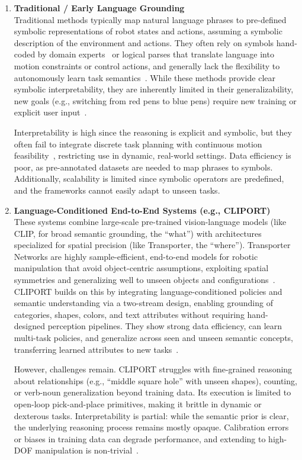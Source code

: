 \documentclass[12pt]{extarticle}
\begin{document}
\begin{enumerate}[label=\Roman*.]
    \item \textbf{Traditional / Early Language Grounding} \\
Traditional methods typically map natural language phrases to pre-defined symbolic representations of robot states and actions, assuming a symbolic description of the environment and actions. They often rely on symbols hand-coded by domain experts~\cite{optimizatoin-and-motion-planning} or logical parses that translate language into motion constraints or control actions, and generally lack the flexibility to autonomously learn task semantics~\cite{learning-neuro-symbolic}. While these methods provide clear symbolic interpretability, they are inherently limited in their generalizability, new goals (e.g., switching from red pens to blue pens) require new training or explicit user input~\cite{ns-vqa}.

Interpretability is high since the reasoning is explicit and symbolic, but they often fail to integrate discrete task planning with continuous motion feasibility~\cite{tamp}, restricting use in dynamic, real-world settings. Data efficiency is poor, as pre-annotated datasets are needed to map phrases to symbols. Additionally, scalability is limited since symbolic operators are predefined, and the frameworks cannot easily adapt to unseen tasks.

    \item \textbf{Language-Conditioned End-to-End Systems (e.g., CLIPORT)} \\
These systems combine large-scale pre-trained vision-language models (like CLIP, for broad semantic grounding, the “what”) with architectures specialized for spatial precision (like Transporter, the “where”). Transporter Networks are highly sample-efficient, end-to-end models for robotic manipulation that avoid object-centric assumptions, exploiting spatial symmetries and generalizing well to unseen objects and configurations~\cite{transporter}. CLIPORT builds on this by integrating language-conditioned policies and semantic understanding via a two-stream design, enabling grounding of categories, shapes, colors, and text attributes without requiring hand-designed perception pipelines. They show strong data efficiency, can learn multi-task policies, and generalize across seen and unseen semantic concepts, transferring learned attributes to new tasks~\cite{cliport}.

However, challenges remain. CLIPORT struggles with fine-grained reasoning about relationships (e.g., “middle square hole” with unseen shapes), counting, or verb-noun generalization beyond training data. Its execution is limited to open-loop pick-and-place primitives, making it brittle in dynamic or dexterous tasks. Interpretability is partial: while the semantic prior is clear, the underlying reasoning process remains mostly opaque. Calibration errors or biases in training data can degrade performance, and extending to high-DOF manipulation is non-trivial~\cite{cliport}.


\end{enumerate}
\end{document}
